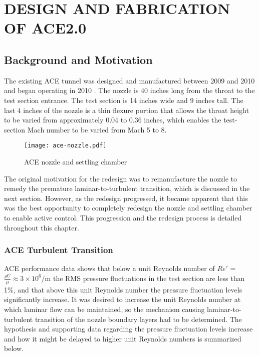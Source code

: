 %
%  
%



\chapter{DESIGN AND FABRICATION OF ACE2.0}

\section{Background and Motivation}

The existing ACE tunnel was designed and manufactured between 2009 and 2010 and began operating in 2010 \cite{ace09,ace10-calibrate,tichenor-dis}. The nozzle is 40 inches long from the throat to the test section entrance. The test section is 14 inches wide and 9 inches tall. The last 4 inches of the nozzle is a thin flexure portion that allows the throat height to be varied from approximately 0.04 to 0.36 inches, which enables the test-section Mach number to be varied from Mach 5 to 8.

\begin{figure}[ht]
    \centering
    \texttt{[image: ace-nozzle.pdf]}
    \caption{ACE nozzle and settling chamber}
    \label{fig:ace-nozzle}
\end{figure}

The original motivation for the redesign was to remanufacture the nozzle to remedy the premature laminar-to-turbulent transition, which is discussed in the next section. However, as the redesign progressed, it became apparent that this was the best opportunity to completely redesign the nozzle and settling chamber to enable active control. This progression and the redesign process is detailed throughout this chapter.

\subsection{ACE Turbulent Transition}

ACE performance data \cite{aceturb,mai-dis,neel-dis,leidy-dis} shows that below a unit Reynolds number of $Re'$ = $\frac{\rho U}{\mu} \approx 3 \times 10^6/\mathrm{m}$ the RMS pressure fluctuations in the test section are less than 1\%, and that above this unit Reynolds number the pressure fluctuation levels significantly increase. It was desired to increase the unit Reynolds number at which laminar flow can be maintained, so the mechanism causing laminar-to-turbulent transition of the nozzle boundary layers had to be determined. The hypothesis and supporting data regarding the pressure fluctuation levels increase and how it might be delayed to higher unit Reynolds numbers is summarized below.

